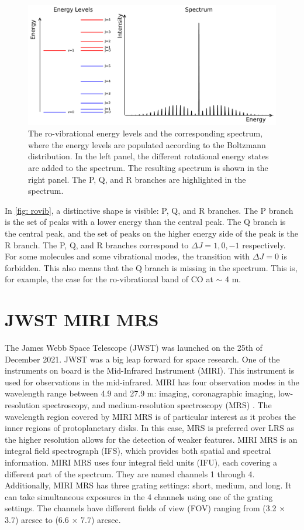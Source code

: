 \documentclass[oneside, single, authoryear, semicolon, 12pt]{lion-msc}
\newcommand{\4}{$_4$}
\newcommand{\3}{$_3$}
\newcommand{\2}{$_2$}
\begin{document}
\begin{figure}[H]
    \centering
    \includegraphics[width=\linewidth]{Figures/RoVibSpectrum.pdf}
    \caption{The ro-vibrational energy levels and the corresponding spectrum, where the energy levels are populated according to the Boltzmann distribution. In the left panel, the different rotational energy states are added to the spectrum. The resulting spectrum is shown in the right panel. The P, Q, and R branches are highlighted in the spectrum. }
    \label{fig: rovib}
\end{figure}

In \autoref{fig: rovib}, a distinctive shape is visible: P, Q, and R branches. The P branch is the set of peaks with a lower energy than the central peak. The Q branch is the central peak, and the set of peaks on the higher energy side of the peak is the R branch. The P, Q, and R branches correspond to $\Delta J=1, 0, -1$ respectively. For some molecules and some vibrational modes, the transition with $\Delta J=0$ is forbidden. This also means that the Q branch is missing in the spectrum. This is, for example, the case for the ro-vibrational band of CO at $\sim$ 4 \textmu m.

\section{JWST MIRI MRS}
The James Webb Space Telescope (JWST) was launched on the 25th of December 2021. JWST was a big leap forward for space research. One of the instruments on board is the Mid-Infrared Instrument (MIRI). This instrument is used for observations in the mid-infrared. MIRI has four observation modes in the wavelength range between 4.9 and 27.9 \textmu m:  imaging, coronagraphic imaging, low-resolution spectroscopy, and medium-resolution spectroscopy (MRS) \citep{}. 
The wavelength region covered by MIRI MRS is of particular interest as it probes the inner regions of protoplanetary disks. In this case, MRS is preferred over LRS as the higher resolution allows for the detection of weaker features. MIRI MRS is an integral field spectrograph (IFS), which provides both spatial and spectral information. MIRI MRS uses four integral field units (IFU), each covering a different part of the spectrum. They are named channels 1 through 4. Additionally, MIRI MRS has three grating settings: short, medium, and long. It can take simultaneous exposures in the 4 channels using one of the grating settings. The channels have different fields of view (FOV) ranging from (3.2 $\times$ 3.7) arcsec to (6.6 $\times$ 7.7) arcsec. 
\end{document}
